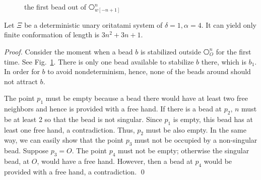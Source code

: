 \begin{figure}[tb]
 \centering
    \caption{the first bead out of $\hexagon_{w[-n+1]}^n$}
    \label{TTT_a4_first}
\end{figure}

\begin{theorem}[$\delta = 1, \alpha = 4$]
Let $\Xi$ be a deterministic unary oritatami system of $\delta = 1, \alpha = 4$. It can yield only finite conformation of length is $3n^2  + 3n + 1$.
\end{theorem}

\begin{proof}
Consider the moment when a bead $b$ is stabilized outside $\hexagon_O^n$ for the first time. 
See Fig.~\ref{TTT_a4_first}.
There is only one bead available to stabilize $b$ there, which is $b_1$. 
In order for $b$ to avoid nondeterminism, hence, none of the beads around should not attract $b$. 

The point $p_1$ must be empty because a bead there would have at least two free neighbors and hence is provided with a free hand. 
If there is a bead at $p_2$, $n$ must be at least 2 so that the bead is not singular. 
Since $p_1$ is empty, this bead has at least one free hand, a contradiction. 
Thus, $p_2$ must be also empty. 
In the same way, we can easily show that the point $p_3$ must not be occupied by a non-singular bead. 
Suppose $p_3 = O$. 
The point $p_4$ must not be empty; otherwise the singular bead, at $O$, would have a free hand. 
However, then a bead at $p_4$ would be provided with a free hand, a contradiction. 
\qed
\end{proof}





